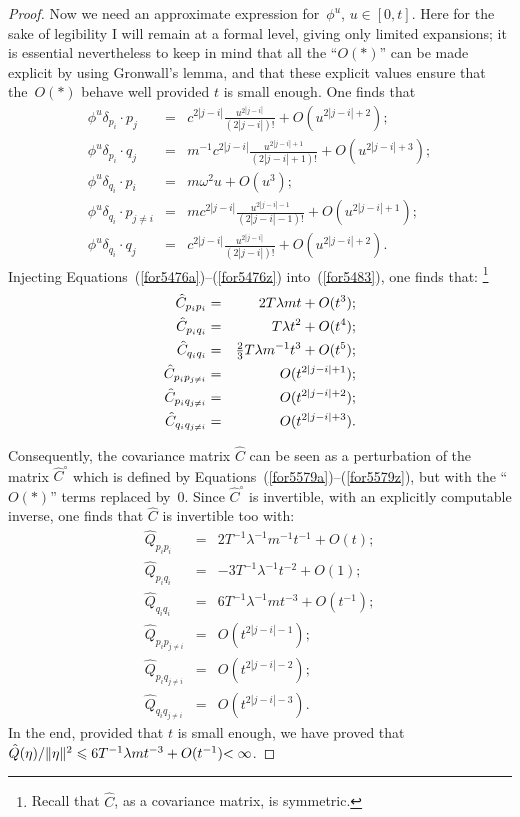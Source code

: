 \begin{proof}
Now we need an approximate expression for~$\phi^u$, $u\in[0,t]$.
Here for the sake of legibility I will remain at a formal level, giving only limited expansions;
it is essential nevertheless to keep in mind that all the ``$O(*)$''
can be made explicit by using Gronwall's lemma,
and that these explicit values ensure that the~$O(*)$ behave well provided $t$ is small enough.
%
One finds that
\begin{eqnarray}
\label{for5476a}
\phi^u \delta_{p_i} \cdot p_j &=& c^{2|j-i|} \frac{u^{2|j-i|}}{(2|j-i|)!} + O(u^{2|j-i|+2}) ;\\
\phi^u \delta_{p_i} \cdot q_j &=& m^{-1}c^{2|j-i|} \frac{u^{2|j-i|+1}}{(2|j-i|+1)!}
+ O(u^{2|j-i|+3}) ;\\
\phi^u \delta_{q_i} \cdot p_i &=& m\omega^2 u + O(u^3) ;\\
\phi^u \delta_{q_i} \cdot p_{j\neq i} &=& mc^{2|j-i|} \frac{u^{2|j-i|-1}}{(2|j-i|-1)!}
+ O(u^{2|j-i|+1}) ;\\
\label{for5476z}
\phi^u \delta_{q_i} \cdot q_j &=& c^{2|j-i|} \frac{u^{2|j-i|}}{(2|j-i|)!} + O(u^{2|j-i|+2}) .
\end{eqnarray}
%
Injecting Equations~(\ref{for5476a})--(\ref{for5476z}) into~(\ref{for5483}), one finds that:%
\footnote{Recall that $\hat{C}$, as a covariance matrix, is symmetric.}
\begin{eqnarray}
\label{for5579a}
\hat{C}_{p_ip_i} &=& 2T\lambda m t + O(t^3) ;\\
\hat{C}_{p_iq_i} &=& T\lambda t^2 + O(t^4) ;\\
\hat{C}_{q_iq_i} &=& \mathsmaller{\frac{2}{3}}T\lambda m^{-1} t^3 + O(t^5) ;\\
\hat{C}_{p_ip_{j\neq i}} &=& O(t^{2|j-i|+1}) ;\\
\hat{C}_{p_iq_{j\neq i}} &=& O(t^{2|j-i|+2}) ;\\
\label{for5579z}
\hat{C}_{q_iq_{j\neq i}} &=& O(t^{2|j-i|+3}).
\end{eqnarray}

Consequently, the covariance matrix $\hat{C}$ can be seen
as a perturbation of the matrix $\hat{C}^\circ$
which is defined by Equations~(\ref{for5579a})--(\ref{for5579z}),
but with the ``$O(*)$'' terms replaced by~$0$.
%
Since $\hat{C}^\circ$ is invertible, with an explicitly computable inverse,
one finds that $\hat{C}$ is invertible too with:
%
\begin{eqnarray}
\hat{Q}_{p_ip_i} &=& 2T^{-1}\lambda^{-1}m^{-1}t^{-1} + O(t) ;\\
\hat{Q}_{p_iq_i} &=& -3T^{-1}\lambda^{-1}t^{-2} + O(1) ;\\
\hat{Q}_{q_iq_i} &=& 6T^{-1}\lambda^{-1}mt^{-3} + O(t^{-1}) ;\\
\hat{Q}_{p_ip_{j\neq i}} &=& O(t^{2|j-i|-1}) ;\\
\hat{Q}_{p_iq_{j\neq i}} &=& O(t^{2|j-i|-2}) ;\\
\hat{Q}_{q_iq_{j\neq i}} &=& O(t^{2|j-i|-3}).
\end{eqnarray}
%
In the end, provided that $t$ is small enough, we have proved that
$\hat{Q}(\eta)/\|\eta\|^2 \leq 6T^{-1}\lambda mt^{-3} + O(t^{-1}) \ab {< \infty}$.


\end{proof}
